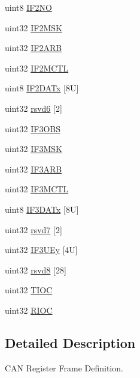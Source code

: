 \begin{DoxyCompactItemize}
\item 
uint8 \mbox{\hyperlink{structcanBase_a90eb4f88e7bab70d32b91d8dc4e28fbb}{I\+F2\+NO}}
\item 
uint32 \mbox{\hyperlink{structcanBase_a579c3b235063b5cb38f59fbfff742a5c}{I\+F2\+M\+SK}}
\item 
uint32 \mbox{\hyperlink{structcanBase_a4bd471bc265d48426c61c65e2fd039cf}{I\+F2\+A\+RB}}
\item 
uint32 \mbox{\hyperlink{structcanBase_a1181a25757f060f1ec12ede4442970df}{I\+F2\+M\+C\+TL}}
\item 
uint8 \mbox{\hyperlink{structcanBase_a143324ec98550cb67a4f4142423b0633}{I\+F2\+D\+A\+Tx}} \mbox{[}8\+U\mbox{]}
\item 
uint32 \mbox{\hyperlink{structcanBase_ac9aeb23c96b23176a09099f5d187ee3a}{rsvd6}} \mbox{[}2\mbox{]}
\item 
uint32 \mbox{\hyperlink{structcanBase_aa3df54152de0b4f6277e4f2429eb767c}{I\+F3\+O\+BS}}
\item 
uint32 \mbox{\hyperlink{structcanBase_a2e1ed9b95a49858df359a8e885e155ec}{I\+F3\+M\+SK}}
\item 
uint32 \mbox{\hyperlink{structcanBase_af68e73a09131a6c79bb080fdcbb47535}{I\+F3\+A\+RB}}
\item 
uint32 \mbox{\hyperlink{structcanBase_a1f3901e707899a1070d85cbd9e9e32c8}{I\+F3\+M\+C\+TL}}
\item 
uint8 \mbox{\hyperlink{structcanBase_a5581e3aff2b321077bb77b3d2eaba5a7}{I\+F3\+D\+A\+Tx}} \mbox{[}8\+U\mbox{]}
\item 
uint32 \mbox{\hyperlink{structcanBase_a15f2853cb362b8efebdcf5db9eccb1d3}{rsvd7}} \mbox{[}2\mbox{]}
\item 
uint32 \mbox{\hyperlink{structcanBase_a2e5dfaefafebbc2918815564d1f37d5a}{I\+F3\+U\+Ey}} \mbox{[}4\+U\mbox{]}
\item 
uint32 \mbox{\hyperlink{structcanBase_a4328aff3c54308138d799f9da22921ea}{rsvd8}} \mbox{[}28\mbox{]}
\item 
uint32 \mbox{\hyperlink{structcanBase_a31ab7573f66e259c4ad5b515817e0bdb}{T\+I\+OC}}
\item 
uint32 \mbox{\hyperlink{structcanBase_acf21910844548f2cd05545153d124dc0}{R\+I\+OC}}
\end{DoxyCompactItemize}


\subsection{Detailed Description}
C\+AN Register Frame Definition. 

